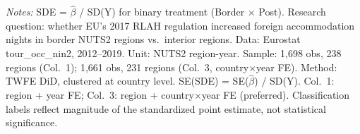 \begin{table}[htbp]
\caption{\label{tab:sde}Standardized Effect Sizes}
\centering
{}
\vspace{0.5em}

\begin{minipage}{\textwidth}
\footnotesize \textit{Notes:} SDE = $\hat{\beta}$ / SD(Y) for binary treatment (Border $\times$ Post). Research question: whether EU's 2017 RLAH regulation increased foreign accommodation nights in border NUTS2 regions vs.\ interior regions. Data: Eurostat tour\_occ\_nin2, 2012--2019. Unit: NUTS2 region-year. Sample: 1,698 obs, 238 regions (Col.\ 1); 1,661 obs, 231 regions (Col.\ 3, country$\times$year FE). Method: TWFE DiD, clustered at country level. SE(SDE) = SE($\hat{\beta}$) / SD(Y). Col.\ 1: region + year FE; Col.\ 3: region + country$\times$year FE (preferred). Classification labels reflect magnitude of the standardized point estimate, not statistical significance.
\end{minipage}
\end{table}
